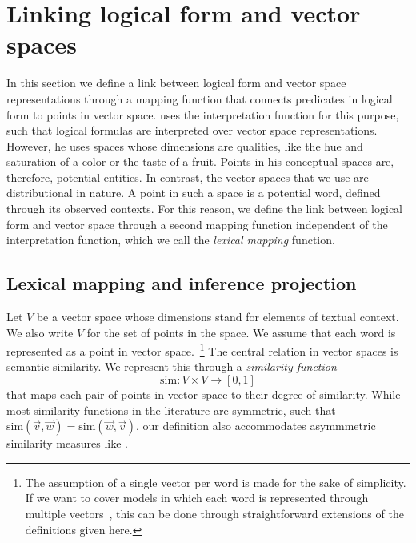 \newcommand{\loglang}{\ensuremath{{\cal{L}}}\xspace}
\newcommand{\predsym}[1]{\ensuremath{{\cal{P}}_{#1}}\xspace}
\newcommand{\simfunc}{\ensuremath{\mathrm{sim}}}

\section{Linking logical form and vector spaces}
\label{sec:interface}

In this section we define a link between logical form and vector space
representations through a mapping function that connects predicates in
logical form to points in vector space. \citet{Gardenfors:04} uses the
interpretation function for this purpose, such that 
logical formulas are interpreted over vector space
representations. However, he uses spaces whose dimensions are
qualities, like the hue and saturation of a color or the taste of a
fruit. Points in his conceptual spaces are, therefore, potential
entities. In contrast, the vector spaces that we use are
distributional in nature. A point in such a space is a potential word,
defined through its observed contexts. For this reason, we define the link between logical form
and vector space through a second mapping function independent of the
interpretation function, which we call the \emph{lexical mapping}
function. 

\subsection*{Lexical mapping and inference projection} 


Let $V$ be a vector space whose dimensions stand for elements of  textual
context. We also write $V$ for the set of points in the space. We assume that each word is represented as a point in vector
space.~\footnote{The assumption of a single vector per word is made
  for the sake of simplicity. If we want to cover models in which each word is
  represented through multiple
  vectors~\citep{ReisingerMooney:10,dinu-lapata:2010:EMNLP}, this can
  be done through straightforward extensions of the definitions given here.} The central relation in vector spaces is semantic
similarity. We represent this through a \textit{similarity function} \[\simfunc: V
\times V \to [0,1] \] that maps each pair of points in vector space to their
degree of similarity. While most similarity functions in the
literature are symmetric, such that  $\simfunc(\vec v, \vec w) = \simfunc(\vec w,
\vec v)$, our definition also accommodates asymmmetric similarity
measures like \citet{kotlerman:nlej2010}. 

